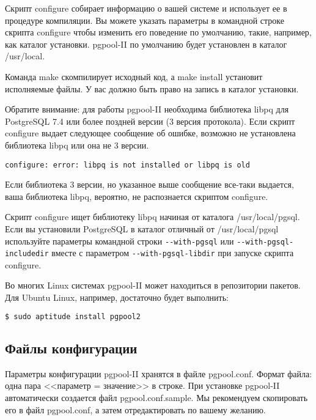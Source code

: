 Скрипт configure собирает информацию о вашей системе и использует ее в процедуре компиляции. Вы можете указать параметры в командной строке скрипта configure чтобы изменить его поведение по умолчанию, такие, например, как каталог установки. pgpool-II по умолчанию будет установлен в каталог /usr/local.

Команда make скомпилирует исходный код, а make install установит исполняемые файлы. У вас должно быть право на запись в каталог установки.

Обратите внимание: для работы pgpool-II необходима библиотека libpq для PostgreSQL 7.4 или более поздней версии (3 версия протокола). Если скрипт configure выдает следующее сообщение об ошибке, возможно не установлена библиотека libpq или она не 3 версии.

\begin{lstlisting}[label=lst:pgpool2,caption=Установка pgpool-II]
configure: error: libpq is not installed or libpq is old
\end{lstlisting}

Если библиотека 3 версии, но указанное выше сообщение все-таки выдается, ваша библиотека libpq, вероятно, не распознается скриптом configure.

Скрипт configure ищет библиотеку libpq начиная от каталога /usr/local/pgsql. Если вы установили PostgreSQL в каталог отличный от /usr/local/pgsql используйте параметры командной строки \lstinline!--with-pgsql! или \lstinline!--with-pgsql-includedir! вместе с параметром \lstinline!--with-pgsql-libdir! при запуске скрипта configure.

Во многих Linux системах pgpool-II может находиться в репозитории пакетов. Для Ubuntu Linux, например, достаточно будет выполнить:

\begin{lstlisting}[language=Bash,label=lst:pgpool3,caption=Установка pgpool-II]
$ sudo aptitude install pgpool2
\end{lstlisting}

\subsection{Файлы конфигурации}

Параметры конфигурации pgpool-II хранятся в файле pgpool.conf. Формат файла: одна пара <<параметр = значение>> в строке. При установке pgpool-II автоматически создается файл pgpool.conf.sample. Мы рекомендуем скопировать его в файл pgpool.conf, а затем отредактировать по вашему желанию.

